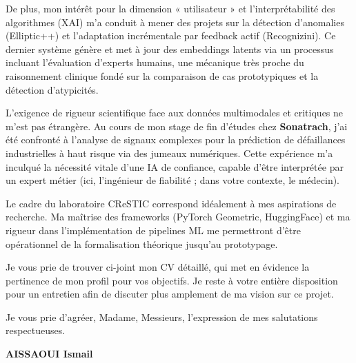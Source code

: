 \documentclass[a4paper,11pt]{article}
\begin{document}
De plus, mon intérêt pour la dimension « utilisateur » et l'interprétabilité des algorithmes (XAI) m'a conduit à mener des projets sur la détection d'anomalies (Elliptic++) et l'adaptation incrémentale par feedback actif (Recognizini). Ce dernier système génère et met à jour des embeddings latents via un processus incluant l'évaluation d'experts humains, une mécanique très proche du raisonnement clinique fondé sur la comparaison de cas prototypiques et la détection d'atypicités.

L'exigence de rigueur scientifique face aux données multimodales et critiques ne m'est pas étrangère. Au cours de mon stage de fin d'études chez \textbf{Sonatrach}, j'ai été confronté à l'analyse de signaux complexes pour la prédiction de défaillances industrielles à haut risque via des jumeaux numériques. Cette expérience m'a inculqué la nécessité vitale d'une IA de confiance, capable d'être interprétée par un expert métier (ici, l'ingénieur de fiabilité ; dans votre contexte, le médecin).

Le cadre du laboratoire CReSTIC correspond idéalement à mes aspirations de recherche. Ma maîtrise des frameworks (PyTorch Geometric, HuggingFace) et ma rigueur dans l'implémentation de pipelines ML me permettront d'être opérationnel de la formalisation théorique jusqu'au prototypage. 

Je vous prie de trouver ci-joint mon CV détaillé, qui met en évidence la pertinence de mon profil pour vos objectifs. Je reste à votre entière disposition pour un entretien afin de discuter plus amplement de ma vision sur ce projet.

Je vous prie d'agréer, Madame, Messieurs, l'expression de mes salutations respectueuses.

\vspace{0.4cm}

\begin{flushleft}
    \textbf{AISSAOUI Ismail}
\end{flushleft}
\end{document}
